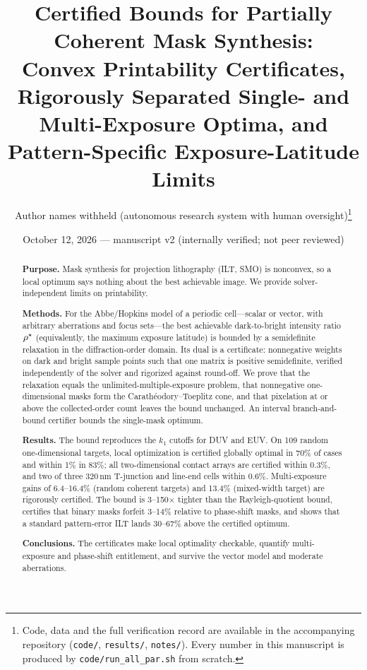 \documentclass[11pt,a4paper]{article}
\title{Certified Bounds for Partially Coherent Mask Synthesis:\\ Convex Printability Certificates, Rigorously Separated Single- and Multi-Exposure Optima, and Pattern-Specific Exposure-Latitude Limits}
\author{Author names withheld (autonomous research system with human oversight)\thanks{Code, data and the full verification record are available in the accompanying repository (\texttt{code/}, \texttt{results/}, \texttt{notes/}). Every number in this manuscript is produced by \texttt{code/run\_all\_par.sh} from scratch.}}
\date{October 12, 2026 --- manuscript v2 (internally verified; not peer reviewed)}
\newcommand{\SI}[2]{\ensuremath{#1\,\mathrm{#2}}}\newcommand{\SIrange}[3]{\ensuremath{#1\text{--}#2\,\mathrm{#3}}}
\begin{document}
\maketitle

\begin{abstract}
\noindent\textbf{Purpose.} Mask synthesis for projection lithography (ILT, SMO) is nonconvex, so a local optimum says nothing about the best achievable image. We provide solver-independent limits on printability.

\noindent\textbf{Methods.} For the Abbe/Hopkins model of a periodic cell---scalar or vector, with arbitrary aberrations and focus sets---the best achievable dark-to-bright intensity ratio $\rho^{\star}$ (equivalently, the maximum exposure latitude) is bounded by a semidefinite relaxation in the diffraction-order domain. Its dual is a certificate: nonnegative weights on dark and bright sample points such that one matrix is positive semidefinite, verified independently of the solver and rigorized against round-off. We prove that the relaxation equals the unlimited-multiple-exposure problem, that nonnegative one-dimensional masks form the Carath\'eodory--Toeplitz cone, and that pixelation at or above the collected-order count leaves the bound unchanged. An interval branch-and-bound certifier bounds the single-mask optimum.

\noindent\textbf{Results.} The bound reproduces the $k_1$ cutoffs for DUV and EUV. On 109 random one-dimensional targets, local optimization is certified globally optimal in 70\% of cases and within 1\% in 83\%; all two-dimensional contact arrays are certified within 0.3\%, and two of three \SI{320}{nm} T-junction and line-end cells within 0.6\%. Multi-exposure gains of 6.4--16.4\% (random coherent targets) and 13.4\% (mixed-width target) are rigorously certified. The bound is 3--150$\times$ tighter than the Rayleigh-quotient bound, certifies that binary masks forfeit 3--14\% relative to phase-shift masks, and shows that a standard pattern-error ILT lands 30--67\% above the certified optimum.

\noindent\textbf{Conclusions.} The certificates make local optimality checkable, quantify multi-exposure and phase-shift entitlement, and survive the vector model and moderate aberrations.
\end{abstract}
\end{document}
